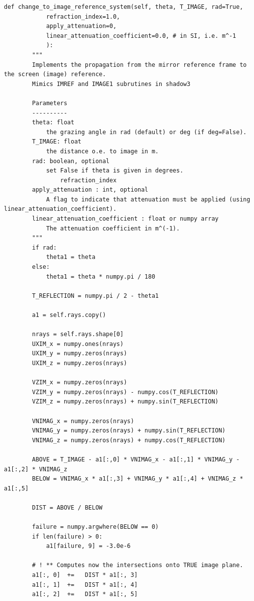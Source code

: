 \documentclass{iucr}
\begin{document}
\begin{lstlisting}[caption={\it Method of {\tt S4Beam} that changes the reference and propagates the beam from the beamline element to the image plane.}, label={lst:changetoimagereferencesystem}, captionpos=b]
   def change_to_image_reference_system(self, theta, T_IMAGE, rad=True,
            refraction_index=1.0,
            apply_attenuation=0,
            linear_attenuation_coefficient=0.0, # in SI, i.e. m^-1
            ):
        """
        Implements the propagation from the mirror reference frame to the screen (image) reference.
        Mimics IMREF and IMAGE1 subrutines in shadow3

        Parameters
        ----------
        theta: float
            the grazing angle in rad (default) or deg (if deg=False).
        T_IMAGE: float
            the distance o.e. to image in m.
        rad: boolean, optional
            set False if theta is given in degrees.
                refraction_index
        apply_attenuation : int, optional
            A flag to indicate that attenuation must be applied (using linear_attenuation_coefficient).
        linear_attenuation_coefficient : float or numpy array
            The attenuation coefficient in m^(-1).
        """
        if rad:
            theta1 = theta
        else:
            theta1 = theta * numpy.pi / 180

        T_REFLECTION = numpy.pi / 2 - theta1

        a1 = self.rays.copy()

        nrays = self.rays.shape[0]
        UXIM_x = numpy.ones(nrays)
        UXIM_y = numpy.zeros(nrays)
        UXIM_z = numpy.zeros(nrays)

        VZIM_x = numpy.zeros(nrays)
        VZIM_y = numpy.zeros(nrays) - numpy.cos(T_REFLECTION)
        VZIM_z = numpy.zeros(nrays) + numpy.sin(T_REFLECTION)

        VNIMAG_x = numpy.zeros(nrays)
        VNIMAG_y = numpy.zeros(nrays) + numpy.sin(T_REFLECTION)
        VNIMAG_z = numpy.zeros(nrays) + numpy.cos(T_REFLECTION)

        ABOVE = T_IMAGE - a1[:,0] * VNIMAG_x - a1[:,1] * VNIMAG_y - a1[:,2] * VNIMAG_z
        BELOW = VNIMAG_x * a1[:,3] + VNIMAG_y * a1[:,4] + VNIMAG_z * a1[:,5]

        DIST = ABOVE / BELOW

        failure = numpy.argwhere(BELOW == 0)
        if len(failure) > 0:
            a1[failure, 9] = -3.0e-6

        # ! ** Computes now the intersections onto TRUE image plane.
        a1[:, 0]  +=   DIST * a1[:, 3]
        a1[:, 1]  +=   DIST * a1[:, 4]
        a1[:, 2]  +=   DIST * a1[:, 5]


\end{lstlisting}
\end{document}
